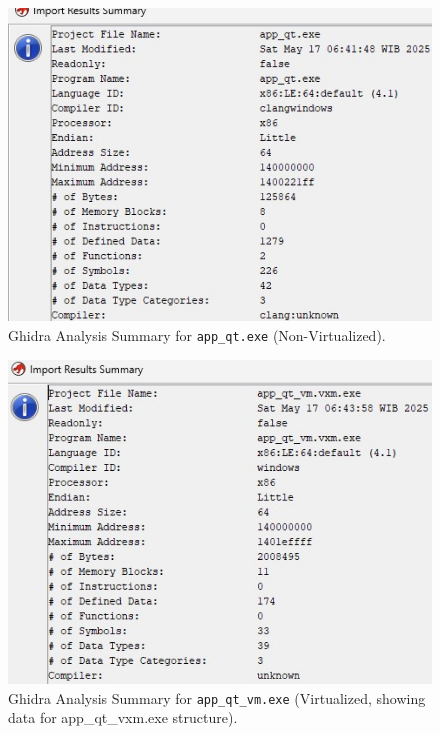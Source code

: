 \begin{figure}[!t]
	\centering
	\includegraphics[width=0.9\linewidth]{../assets/pics/app_qt_summary_result.jpeg}
	\caption{Ghidra Analysis Summary for \texttt{app\_qt.exe} (Non-Virtualized).}
	\label{fig:ghidra_summary_qt_journal}
\end{figure}

\begin{figure}[!t]
	\centering
	\includegraphics[width=0.9\linewidth]{../assets/pics/app_qt_vm_summary_result.jpeg}
	\caption{Ghidra Analysis Summary for \texttt{app\_qt\_vm.exe} (Virtualized, showing data for app\_qt\_vxm.exe structure).}
	\label{fig:ghidra_summary_qt_vm_journal}
\end{figure}

